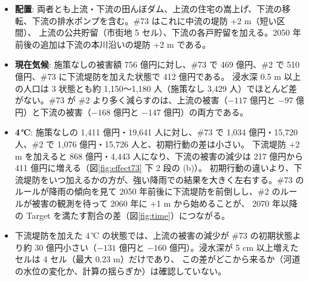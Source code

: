 \documentclass[a4paper,10pt]{ltjsarticle}
\begin{document}
\begin{itemize}
  \item \textbf{配置}: 両者とも上流・下流の田んぼダム、上流の住宅の嵩上げ、下流の移転、下流の排水ポンプを含む。\#73 はこれに中流の堤防 +2 m（短い区間）、
    上流の公共貯留（市街地 5 セル）、下流の各戸貯留を加える。2050 年前後の追加は下流の本川沿いの堤防 +2 m である。
  \item \textbf{現在気候}: 施策なしの被害額 756 億円に対し、\#73 で 469 億円、\#2 で 510 億円、\#73 に下流堤防を加えた状態で 412 億円である。
    浸水深 0.5 m 以上の人口は 3 状態とも約 1,150〜1,180 人（施策なし 3,429 人）でほとんど差がない。\#73 が \#2 より多く減らすのは、上流の被害（$-117$ 億円と $-97$ 億円）と下流の被害（$-168$ 億円と $-147$ 億円）の両方である。
  \item \textbf{4\,℃}: 施策なしの 1,411 億円・19,641 人に対し、\#73 で 1,034 億円・15,720 人、\#2 で 1,076 億円・15,726 人と、初期行動の差は小さい。
    下流堤防 +2 m を加えると 868 億円・4,443 人になり、下流の被害の減少は 217 億円から 411 億円に増える（図\ref{fig:effect73} 下 2 段の (b)）。
    初期行動の違いより、下流堤防をいつ加えるかの方が、強い降雨での結果を大きく左右する。\#73 のルールが降雨の傾向を見て 2050 年前後に下流堤防を前倒しし、\#2 のルールが被害の観測を待って 2060 年に +1 m から始めることが、
    2070 年以降の Target を満たす割合の差（図\ref{fig:time}）につながる。
  \item 下流堤防を加えた 4\,℃ の状態では、上流の被害の減少が \#73 の初期状態より約 30 億円小さい（$-131$ 億円と $-160$ 億円）。浸水深が 5 cm 以上増えたセルは 4 セル（最大 0.23 m）だけであり、
    この差がどこから来るか（河道の水位の変化か、計算の揺らぎか）は確認していない。
\end{itemize}
\end{document}
